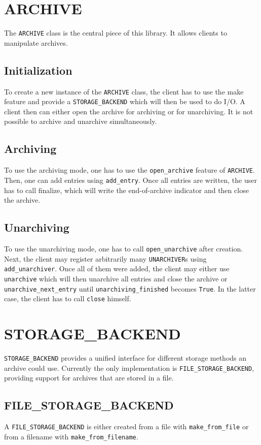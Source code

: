 \chapter{ARCHIVE}
The \lstinline;ARCHIVE; class is the central piece of this library. It allows
clients to manipulate archives.

\section{Initialization}
To create a new instance of the \lstinline;ARCHIVE; class, the client has to use
the make feature and provide a \lstinline;STORAGE_BACKEND; which will then be
used to do I/O. A client then can either open the archive for archiving or for
unarchiving. It is not possible to archive and unarchive simultaneously.

\section{Archiving}
To use the archiving mode, one has to use the \lstinline;open_archive; feature
of \lstinline;ARCHIVE;. Then, one can add entries using \lstinline;add_entry;.
Once all entries are written, the user has to call finalize, which will write
the end-of-archive indicator and then close the archive.

\section{Unarchiving}
To use the unarchiving mode, one has to call \lstinline;open_unarchive; after
creation. Next, the client may register arbitrarily many \lstinline;UNARCHIVER;s
using \lstinline;add_unarchiver;. Once all of them were added, the client may
either use \lstinline;unarchive; which will then unarchive all entries and close
the archive or \lstinline;unarchive_next_entry; until
\lstinline;unarchiving_finished; becomes \lstinline;True;. In the latter case,
the client has to call \lstinline;close; himself.

\chapter{STORAGE\_BACKEND}
\lstinline;STORAGE_BACKEND; provides a unified interface for different storage
methods an archive could use. Currently the only implementation is
\lstinline;FILE_STORAGE_BACKEND;, providing support for archives that are stored
in a file.

\section{FILE\_STORAGE\_BACKEND}
A \lstinline;FILE_STORAGE_BACKEND; is either created from a file with
\lstinline;make_from_file; or from a filename with
\lstinline;make_from_filename;.

